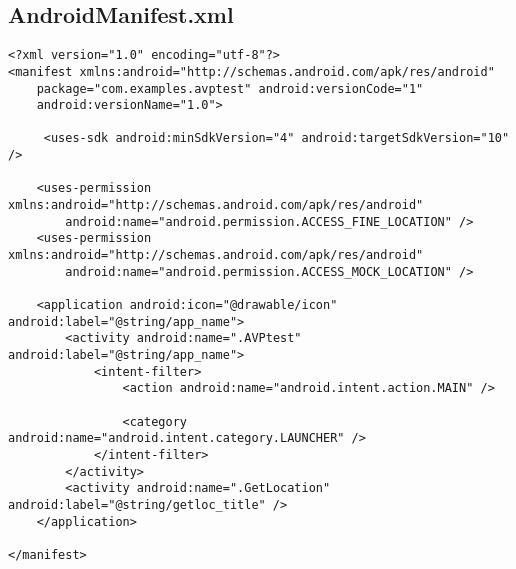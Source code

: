 \documentclass[letterpaper,twocolumn,10pt]{article}
\begin{document}
\subsection{AndroidManifest.xml}
\begin{lstlisting}
<?xml version="1.0" encoding="utf-8"?>
<manifest xmlns:android="http://schemas.android.com/apk/res/android"
	package="com.examples.avptest" android:versionCode="1"
	android:versionName="1.0">
	
     <uses-sdk android:minSdkVersion="4" android:targetSdkVersion="10" />
    
	<uses-permission xmlns:android="http://schemas.android.com/apk/res/android"
		android:name="android.permission.ACCESS_FINE_LOCATION" />
	<uses-permission xmlns:android="http://schemas.android.com/apk/res/android"
		android:name="android.permission.ACCESS_MOCK_LOCATION" />

	<application android:icon="@drawable/icon" android:label="@string/app_name">
		<activity android:name=".AVPtest" android:label="@string/app_name">
			<intent-filter>
				<action android:name="android.intent.action.MAIN" />

				<category android:name="android.intent.category.LAUNCHER" />
			</intent-filter>
		</activity>
		<activity android:name=".GetLocation" android:label="@string/getloc_title" />
	</application>

</manifest>
\end{lstlisting}

\label{app:appendixB}
\end{document}
